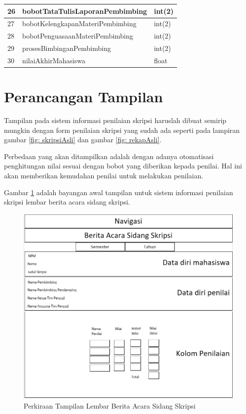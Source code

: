 \begin{table}[H]
\centering
	\begin{tabular}{| m{0.75cm} | m{7cm} | m{3cm} |}
	\hline
		26 & bobotTataTulisLaporanPembimbing & int(2)\\
		\hline
		27 & bobotKelengkapanMateriPembimbing & int(2)\\
		\hline
		28 & bobotPenguasaanMateriPembimbing & int(2)\\
		\hline
		29 & prosesBimbinganPembimbing & int(2)\\
		\hline
		30 & nilaiAkhirMahasiswa & float\\
		\hline
		\end{tabular}
	\end{table}
	
	\section{Perancangan Tampilan}
	\label{sec: perancanganTampilan}
	
	Tampilan pada sistem informasi penilaian skripsi haruslah dibuat semirip mungkin dengan form penilaian skripsi yang sudah ada seperti pada lampiran gambar \ref{fig: skripsiAsli} dan gambar \ref{fig: rekapAsli}.
	
	Perbedaan yang akan ditampilkan adalah dengan adanya otomatisasi penghitungan nilai sesuai dengan bobot yang diberikan kepada penilai. Hal ini akan memberikan kemudahan penilai untuk melakukan penilaian.
	
	Gambar \ref{fig:beritaacara} adalah bayangan awal tampilan untuk sistem informasi penilaian skripsi lembar berita acara sidang skripsi.
	\begin{figure}[H]
		\centering
		\includegraphics[scale=0.75]{Gambar/beritaacara}
		\caption{Perkiraan Tampilan Lembar Berita Acara Sidang Skripsi}
		\label{fig:beritaacara}
	\end{figure}

